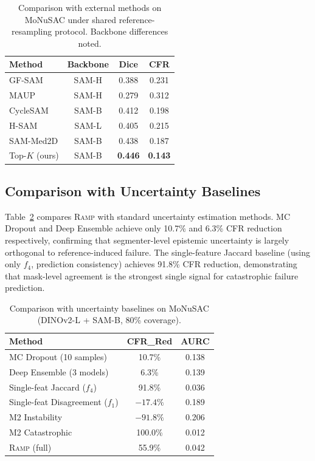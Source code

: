 \documentclass[11pt]{article}
\newcommand{\RAMP}{\textsc{Ramp}}
\begin{document}
\begin{table}[t]
\centering
\caption{Comparison with external methods on MoNuSAC under shared
  reference-resampling protocol. Backbone differences noted.}
\label{tab:external}
\begin{tabular}{lccc}
\toprule
Method & Backbone & Dice & CFR \\
\midrule
GF-SAM      & SAM-H   & 0.388 & 0.231 \\
MAUP        & SAM-H   & 0.279 & 0.312 \\
CycleSAM    & SAM-B   & 0.412 & 0.198 \\
H-SAM       & SAM-L   & 0.405 & 0.215 \\
SAM-Med2D   & SAM-B   & 0.438 & 0.187 \\
\midrule
Top-$K$ (ours) & SAM-B   & \textbf{0.446} & \textbf{0.143} \\
\bottomrule
\end{tabular}
\end{table}

\subsection{Comparison with Uncertainty Baselines}

Table~\ref{tab:uncertainty} compares \RAMP{} with standard uncertainty
estimation methods. MC Dropout and Deep Ensemble achieve only 10.7\% and
6.3\% CFR reduction respectively, confirming that segmenter-level epistemic
uncertainty is largely orthogonal to reference-induced failure. The
single-feature Jaccard baseline (using only $f_4$, prediction consistency)
achieves 91.8\% CFR reduction, demonstrating that mask-level agreement is
the strongest single signal for catastrophic failure prediction.

\begin{table}[t]
\centering
\caption{Comparison with uncertainty baselines on MoNuSAC
  (DINOv2-L + SAM-B, 80\% coverage).}
\label{tab:uncertainty}
\begin{tabular}{lcc}
\toprule
Method & CFR\_Red & AURC \\
\midrule
MC Dropout (10 samples)    & 10.7\% & 0.138 \\
Deep Ensemble (3 models)   & 6.3\%  & 0.139 \\
Single-feat Jaccard ($f_4$) & 91.8\% & 0.036 \\
Single-feat Disagreement ($f_1$) & $-17.4\%$ & 0.189 \\
M2 Instability            & $-91.8\%$ & 0.206 \\
M2 Catastrophic           & 100.0\% & 0.012 \\
\midrule
\RAMP{} (full)             & 55.9\%  & 0.042 \\
\bottomrule
\end{tabular}
\end{table}
\end{document}
